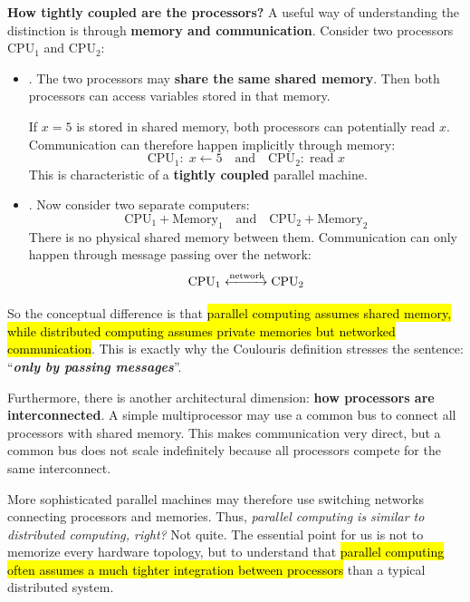 \highspace
\textcolor{Green3}{ \textbf{How tightly coupled are the processors?}} A useful way of understanding the distinction is through \textbf{memory and communication}. Consider two processors $\text{CPU}_{1}$ and $\text{CPU}_2$:
\begin{itemize}
    \item {}. The two processors may \textbf{share the same shared memory}. Then both processors can access variables stored in that memory.

        If $x=5$ is stored in shared memory, both processors can potentially read $x$. Communication can therefore happen implicitly through memory:
        \begin{equation*}
            \text{CPU}_{1}: \; x \leftarrow 5 \quad \text{and} \quad \text{CPU}_{2}: \; \text{read } x
        \end{equation*}
        This is characteristic of a \textbf{tightly coupled} parallel machine.

    \item {}. Now consider two separate computers:
        \begin{equation*}
            \text{CPU}_{1} + \text{Memory}_{1} \quad \text{and} \quad \text{CPU}_{2} + \text{Memory}_{2}
        \end{equation*}
        There is no physical shared memory between them. Communication can only happen through message passing over the network:
        \begin{equation*}
            \text{CPU}_{1} \xleftrightarrow{\text{network}} \text{CPU}_{2}
        \end{equation*}
\end{itemize}
So the conceptual difference is that \hl{parallel computing assumes shared memory, while distributed computing assumes private memories but networked communication}. This is exactly why the Coulouris definition stresses the sentence: ``\textbf{\emph{only by passing messages}}''.

\highspace
Furthermore, there is another architectural dimension: \textbf{how processors are interconnected}. A simple multiprocessor may use a common bus to connect all processors with shared memory. This makes communication very direct, but a common bus does not scale indefinitely because all processors compete for the same interconnect.

\highspace
\textcolor{Red2}{} More sophisticated parallel machines may therefore use switching networks connecting processors and memories. Thus, \emph{parallel computing is similar to distributed computing, right?} Not quite. The essential point for us is not to memorize every hardware topology, but to understand that \hl{parallel computing often assumes a much tighter integration between processors} than a typical distributed system.

